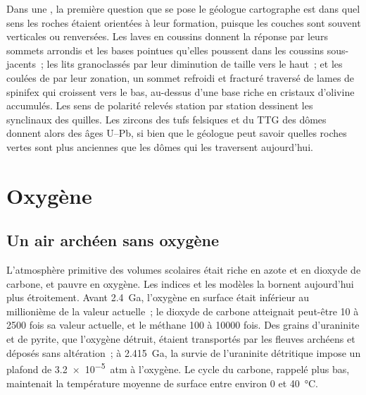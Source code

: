 \begin{inthefield}
Dans une , la première question que se pose le géologue cartographe est dans quel sens les
roches étaient orientées à leur formation, puisque les couches sont souvent verticales ou renversées. Les laves en coussins
donnent la réponse par leurs sommets arrondis et les bases pointues qu'elles poussent dans les coussins sous-jacents~;
les lits granoclassés par leur diminution de taille vers le haut~; et les coulées de  par leur zonation, un
sommet refroidi et fracturé traversé de lames de spinifex qui croissent vers le bas, au-dessus d'une base riche
en cristaux d'olivine accumulés. Les sens de polarité relevés station par station dessinent les synclinaux des quilles.
Les zircons des tufs felsiques et du TTG des dômes donnent alors des âges U--Pb, si bien que le géologue peut savoir
quelles roches vertes sont plus anciennes que les dômes qui les traversent aujourd'hui.
\end{inthefield}

\section{Oxygène}\label{sec:b2:precambrian-earth:oxygen}

\subsection*{Un air archéen sans oxygène}

L'atmosphère primitive des volumes scolaires était riche en azote et en dioxyde de carbone, et pauvre en oxygène.
Les indices et les modèles la bornent aujourd'hui plus étroitement. Avant \qty{2.4}{Ga}, l'oxygène en surface
était inférieur au millionième de la valeur actuelle~; le dioxyde de carbone atteignait peut-être 10 à 2500 fois
sa valeur actuelle, et le méthane 100 à \num{10000} fois. Des grains d'uraninite et de pyrite, que l'oxygène
détruit, étaient transportés par les fleuves archéens et déposés sans altération~; à \qty{2.415}{Ga},
la survie de l'uraninite détritique impose un plafond de \qty{3.2e-5}{atm} à l'oxygène. Le cycle du carbone, rappelé
plus bas, maintenait la température moyenne de surface entre environ 0 et \qty{40}{\celsius}.

